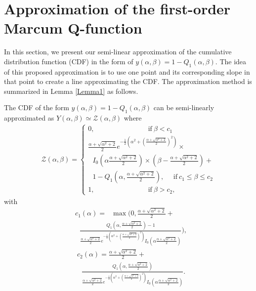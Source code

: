 \section{Approximation of the first-order Marcum Q-function}
In this section, we present our semi-linear approximation of the cumulative distribution function (CDF) in the form of $y(\alpha, \beta ) = 1-Q_1(\alpha,\beta)$. The idea of this proposed approximation is to use one point and its corresponding slope in that point to create a line  approximating the CDF. The approximation method is summarized in Lemma \ref{Lemma1} as follows.
\begin{lem}\label{Lemma1}
 The CDF of the form $y(\alpha, \beta ) = 1-Q_1(\alpha,\beta)$ can be semi-linearly approximated as $Y(\alpha,\beta)\simeq \mathcal{Z}(\alpha, \beta)$ where
\begin{align}\label{eq_lema1}
\mathcal{Z}(\alpha, \beta)=
\begin{cases}
0,  ~~~~~~~~~~~~~~~~~~~~~~~~~~~~~~~~~~~\mathrm{if}~ \beta < c_1  \\ 
 \frac{\alpha+\sqrt{\alpha^2+2}}{2} e^{-\frac{1}{2}\left(\alpha^2+\left(\frac{\alpha+\sqrt{\alpha^2+2}}{2}\right)^2\right)}\times\\
 ~~~I_0\left(\alpha\frac{\alpha+\sqrt{\alpha^2+2}}{2}\right)\times\left(\beta-\frac{\alpha+\sqrt{\alpha^2+2}}{2}\right)+\\
 ~~~1-Q_1\left(\alpha,\frac{\alpha+\sqrt{\alpha^2+2}}{2}\right),  ~~~~~~\mathrm{if}~ c_1 \leq\beta\leq c_2 \\
1,  ~~~~~~~~~~~~~~~~~~~~~~~~~~~~~~~~~~~\mathrm{if}~ \beta> c_2,
\end{cases}
\end{align}
with
\begin{align}\label{eq_c1}
   & c_1(\alpha) =~~~ \max\Bigg(0,\frac{\alpha+\sqrt{\alpha^2+2}}{2}+\nonumber\\
    &~~~\frac{Q_1\left(\alpha,\frac{\alpha+\sqrt{\alpha^2+2}}{2}\right)-1}{\frac{\alpha+\sqrt{\alpha^2+2}}{2} e^{-\frac{1}{2}\left(\alpha^2+\left(\frac{\alpha+\sqrt{\alpha^2+2}}{2}\right)^2\right)}I_0\left(\alpha\frac{\alpha+\sqrt{\alpha^2+2}}{2}\right)}\Bigg),
\end{align}
\begin{align}\label{eq_c2}
   & c_2(\alpha) = \frac{\alpha+\sqrt{\alpha^2+2}}{2}+\nonumber\\
   & ~~~\frac{Q_1\left(\alpha,\frac{\alpha+\sqrt{\alpha^2+2}}{2}\right)}{\frac{\alpha+\sqrt{\alpha^2+2}}{2} e^{-\frac{1}{2}\left(\alpha^2+\left(\frac{\alpha+\sqrt{\alpha^2+2}}{2}\right)^2\right)}I_0\left(\alpha\frac{\alpha+\sqrt{\alpha^2+2}}{2}\right)}.
\end{align}
\end{lem}
